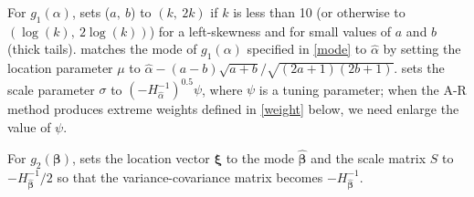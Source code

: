 \documentclass[article]{jss}
\begin{document}
For $g_1(\alpha)$,  sets ($a,~ b$) to $(k,~ 2k)$ if $k$ is less than 10 (or otherwise to $(\log(k),~ 2\log(k))$)   for a left-skewness  and for small values of $a$ and $b$ (thick tails).  matches the mode of $g_1(\alpha)$ specified in  \eqref{mode} to $\hat{\alpha}$ by setting the location parameter $\mu$ to $\hat{\alpha}-(a-b)\sqrt{a+b}/\sqrt{(2a+1)(2b+1)}$.  sets  the scale parameter $\sigma$ to $(-H^{-1}_{\hat{\alpha}})^{0.5}\psi$, where $\psi$ is a tuning parameter; when the A-R method produces extreme weights defined in  \eqref{weight} below, we need enlarge the value of $\psi$.  %

For $g_2(\boldsymbol{\beta})$,   sets the location vector $\boldsymbol{\xi}$ to the mode $\hat{\boldsymbol{\beta}}$ and the scale matrix $S$ to $-H^{-1}_{\hat{\boldsymbol{\beta}}}/2$ so that the variance-covariance matrix becomes $-H^{-1}_{\hat{\boldsymbol{\beta}}}$.
\end{document}
